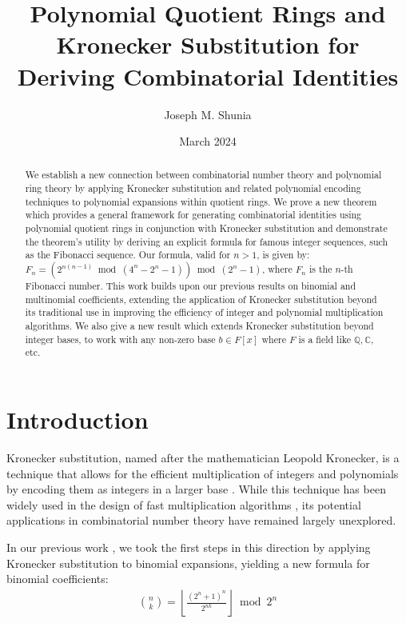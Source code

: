 \documentclass[12pt,reqno]{article}
\theoremstyle{plain}
\theoremstyle{definition}
\begin{document}
\title{Polynomial Quotient Rings and Kronecker Substitution for Deriving Combinatorial Identities}
\author{Joseph M. Shunia}
\date{March 2024}

\maketitle

\begin{abstract}
We establish a new connection between combinatorial number theory and polynomial ring theory by applying Kronecker substitution and related polynomial encoding techniques to polynomial expansions within quotient rings. We prove a new theorem which provides a general framework for generating combinatorial identities using polynomial quotient rings in conjunction with Kronecker substitution and demonstrate the theorem's utility by deriving an explicit formula for famous integer sequences, such as the Fibonacci sequence. Our formula, valid for $n > 1$, is given by: $F_n = (2^{n (n - 1)} \bmod{(4^n-2^n-1)}) \bmod{(2^n-1)}$, where $F_n$ is the $n$-th Fibonacci number. This work builds upon our previous results on binomial and multinomial coefficients, extending the application of Kronecker substitution beyond its traditional use in improving the efficiency of integer and polynomial multiplication algorithms. We also give a new result which extends Kronecker substitution beyond integer bases, to work with any non-zero base $b \in F[x]$ where $F$ is a field like $\mathbb{Q}, \mathbb{C}$, etc.
\end{abstract}

\section{Introduction}
Kronecker substitution, named after the mathematician Leopold Kronecker, is a technique that allows for the efficient multiplication of integers and polynomials by encoding them as integers in a larger base \cite{kronecker1882}. While this technique has been widely used in the design of fast multiplication algorithms \cite{harvey2009kronecker, harvey2014faster}, its potential applications in combinatorial number theory have remained largely unexplored.

In our previous work \cite{shunia2023simple}, we took the first steps in this direction by applying Kronecker substitution to binomial expansions, yielding a new formula for binomial coefficients:
\begin{align*}
    \binom{n}{k} = \left\lfloor \frac{(2^n+1)^n}{2^{n k}} \right\rfloor \bmod{2^n}
\end{align*}
\end{document}
